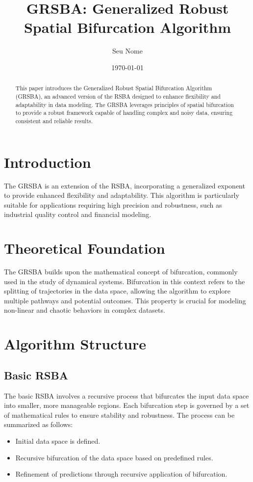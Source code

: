 \documentclass{article}
\title{GRSBA: Generalized Robust Spatial Bifurcation Algorithm}
\author{Seu Nome}
\date{\today}
\begin{document}
\maketitle

\begin{abstract}
This paper introduces the Generalized Robust Spatial Bifurcation Algorithm (GRSBA), an advanced version of the RSBA designed to enhance flexibility and adaptability in data modeling. The GRSBA leverages principles of spatial bifurcation to provide a robust framework capable of handling complex and noisy data, ensuring consistent and reliable results.
\end{abstract}

\section{Introduction}
The GRSBA is an extension of the RSBA, incorporating a generalized exponent to provide enhanced flexibility and adaptability. This algorithm is particularly suitable for applications requiring high precision and robustness, such as industrial quality control and financial modeling.

\section{Theoretical Foundation}
The GRSBA builds upon the mathematical concept of bifurcation, commonly used in the study of dynamical systems. Bifurcation in this context refers to the splitting of trajectories in the data space, allowing the algorithm to explore multiple pathways and potential outcomes. This property is crucial for modeling non-linear and chaotic behaviors in complex datasets.

\section{Algorithm Structure}
\subsection{Basic RSBA}
The basic RSBA involves a recursive process that bifurcates the input data space into smaller, more manageable regions. Each bifurcation step is governed by a set of mathematical rules to ensure stability and robustness. The process can be summarized as follows:
\begin{itemize}
    \item Initial data space is defined.
    \item Recursive bifurcation of the data space based on predefined rules.
    \item Refinement of predictions through recursive application of bifurcation.
\end{itemize}
\end{document}
